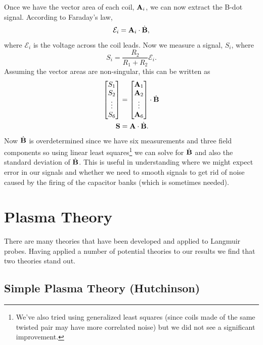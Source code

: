 Once we have the vector area of each coil, $\vb{A}_i$, we can now extract the B-dot signal. According to Faraday's law,
\begin{equation}
    \mathcal{E}_i = \vb{A}_i\cdot\dot{\vb{B}},
\end{equation}
where $\mathcal{E}_i$ is the voltage across the coil leads. Now we measure a signal, $S_i$, where
\begin{equation}
    S_i = \frac{R_2}{R_1 + R_2} \mathcal{E}_i.
\end{equation}
Assuming the vector areas are non-singular, this can be written as
\begin{align}
    \begin{bmatrix}
        S_1 \\
        S_2 \\
        \vdots \\
        S_6
    \end{bmatrix} &= \begin{bmatrix}
        \vb{A}_1 \\
        \vb{A}_2 \\
        \vdots \\
        \vb{A}_6 \\
    \end{bmatrix} \cdot \dot{\vb{B}} \\
    \vb{S} &= \vb{A} \cdot \dot{\vb{B}}.
\end{align}
Now $\dot{\vb{B}}$ is overdetermined since we have six measurements and three field components so using linear least squares\footnote{We've also tried using generalized least squares (since coils made of the same twisted pair may have more correlated noise) but we did not see a significant improvement.} we can solve for $\dot{\vb{B}}$ and also the standard deviation of $\dot{\vb{B}}$. This is useful in understanding where we might expect error in our signals and whether we need to smooth signals to get rid of noise caused by the firing of the capacitor banks (which is sometimes needed).

\section{Plasma Theory}

There are many theories that have been developed and applied to Langmuir probes. Having applied a number of potential theories to our results we find that two theories stand out.

\subsection{Simple Plasma Theory (Hutchinson)}
\label{sss:multitip_hutchinson_theory}


